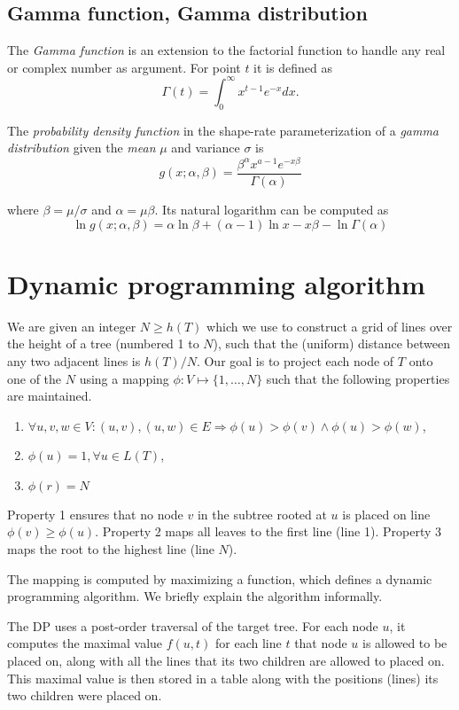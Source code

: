 \documentclass{llncs}
\begin{document}
\subsection{Gamma function, Gamma distribution}

The {\em Gamma function} is an extension to the factorial function to handle
any real or complex number as argument. For point $t$ it is defined as
$$\Gamma(t) = \int_0^\infty x^{t-1} e^{-x} dx.$$

The {\em probability density function} in the shape-rate parameterization of a
{\em gamma distribution} given the {\em mean} $\mu$ and variance $\sigma$ is
$$ g(x;\alpha,\beta) = \frac{\beta^{\alpha}x^{a-1}e^{-x\beta}}{\Gamma(\alpha)} $$

where $\beta = \mu / \sigma$ and $\alpha = \mu \beta$.
Its natural logarithm can be computed as
$$ \ln g(x;\alpha,\beta) = \alpha\ln\beta + (\alpha-1)\ln x -x\beta - \ln\Gamma(\alpha) $$

\section{Dynamic programming algorithm}

We are given an integer $N \geq h(T)$ which we use to construct a grid of lines
over the height of a tree (numbered 1 to $N$), such that the (uniform) distance between any two
adjacent lines is $h(T) / N$.  Our goal is to project each node of $T$ onto one
of the $N$ using a mapping $\phi : V \mapsto \{1,\ldots,N\}$ such that the
following properties are maintained.
\begin{enumerate}
\item $\forall u,v,w \in V : (u,v), (u,w) \in E \Rightarrow \phi(u) > \phi(v) \wedge \phi(u) > \phi(w)$,
\item $\phi(u) = 1, \forall u \in L(T)$,
\item $\phi(r) = N$
\end{enumerate}

Property 1 ensures that no node $v$ in the subtree rooted at $u$ is placed on
line $\phi(v) \geq \phi(u)$. Property 2 maps all leaves to the first line (line 1).
Property 3 maps the root to the highest line (line $N$).

The mapping is computed by maximizing a function, which defines a
dynamic programming algorithm.  We briefly explain the algorithm informally.

The DP uses a post-order traversal of the target tree. For each node $u$, it
computes the maximal value $f(u,t)$ for each line $t$ that node $u$ is allowed to be
placed on, along with all the lines that its two children are allowed to placed
on. This maximal value is then stored in a table along with the positions (lines) its
two children were placed on. 
\end{document}
